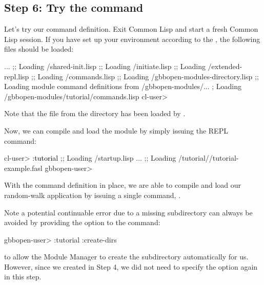 \documentclass[10pt,twoside,english,pdftex]{article}
\begin{document}
\subsection*{Step 6: Try the  command}

Let's try our command definition.  Exit Common Lisp and start a fresh
Common Lisp session.  If you have set up your environment according to the
,
the following files should be loaded:
%
\W\supp
\begin{example}
\textcolor{darkergray}{%
     ...
  ;; Loading /shared-init.lisp
  ;;   Loading /initiate.lisp
  ;;     Loading /extended-repl.lisp
  ;;     Loading /commands.lisp
  ;;     Loading /gbbopen-modules-directory.lisp
  ;; Loading module command definitions from /gbbopen-modules/...
  ;      Loading /gbbopen-modules/tutorial/commands.lisp
  cl-user>}
\end{example}
%
Note that the  file from the 
directory has been loaded by
.

Now, we can compile and load the  module by simply issuing the
 REPL command:
%
\W\supp
\begin{example}
\textcolor{darkergray}{%
  cl-user> \textcolor{black}{:tutorial}
  ;; Loading /startup.lisp
     ...
  ;; Loading /tutorial//tutorial-example.fasl
  gbbopen-user>}
\end{example}
%
With the command definition in place, we are able to compile and load our
random-walk application by issuing a single command, .

Note a potential continuable error due to a missing
 subdirectory can always be avoided by
providing the  option to the  command:
%
\W\supp
\begin{example}
\textcolor{darkergray}{%
  gbbopen-user> :tutorial :create-dirs}
\end{example}
%
to allow the Module Manager to create the 
subdirectory automatically for us.  However, since we created
 in Step 4, we did not need to specify the
 option again in this step.
\end{document}
